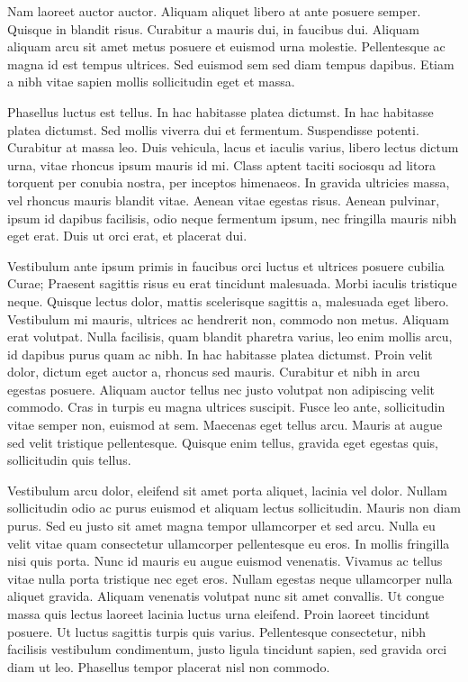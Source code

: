 \documentclass[a4paper]{article}
\begin{document}
Nam laoreet auctor auctor. Aliquam aliquet libero at ante posuere semper. Quisque in blandit risus. Curabitur a mauris dui, in faucibus dui. Aliquam aliquam arcu sit amet metus posuere et euismod urna molestie. Pellentesque ac magna id est tempus ultrices. Sed euismod sem sed diam tempus dapibus. Etiam a nibh vitae sapien mollis sollicitudin eget et massa.

Phasellus luctus est tellus. In hac habitasse platea dictumst. In hac habitasse platea dictumst. Sed mollis viverra dui et fermentum. Suspendisse potenti. Curabitur at massa leo. Duis vehicula, lacus et iaculis varius, libero lectus dictum urna, vitae rhoncus ipsum mauris id mi. Class aptent taciti sociosqu ad litora torquent per conubia nostra, per inceptos himenaeos. In gravida ultricies massa, vel rhoncus mauris blandit vitae. Aenean vitae egestas risus. Aenean pulvinar, ipsum id dapibus facilisis, odio neque fermentum ipsum, nec fringilla mauris nibh eget erat. Duis ut orci erat, et placerat dui.

Vestibulum ante ipsum primis in faucibus orci luctus et ultrices posuere cubilia Curae; Praesent sagittis risus eu erat tincidunt malesuada. Morbi iaculis tristique neque. Quisque lectus dolor, mattis scelerisque sagittis a, malesuada eget libero. Vestibulum mi mauris, ultrices ac hendrerit non, commodo non metus. Aliquam erat volutpat. Nulla facilisis, quam blandit pharetra varius, leo enim mollis arcu, id dapibus purus quam ac nibh. In hac habitasse platea dictumst. Proin velit dolor, dictum eget auctor a, rhoncus sed mauris. Curabitur et nibh in arcu egestas posuere. Aliquam auctor tellus nec justo volutpat non adipiscing velit commodo. Cras in turpis eu magna ultrices suscipit. Fusce leo ante, sollicitudin vitae semper non, euismod at sem. Maecenas eget tellus arcu. Mauris at augue sed velit tristique pellentesque. Quisque enim tellus, gravida eget egestas quis, sollicitudin quis tellus.

Vestibulum arcu dolor, eleifend sit amet porta aliquet, lacinia vel dolor. Nullam sollicitudin odio ac purus euismod et aliquam lectus sollicitudin. Mauris non diam purus. Sed eu justo sit amet magna tempor ullamcorper et sed arcu. Nulla eu velit vitae quam consectetur ullamcorper pellentesque eu eros. In mollis fringilla nisi quis porta. Nunc id mauris eu augue euismod venenatis. Vivamus ac tellus vitae nulla porta tristique nec eget eros. Nullam egestas neque ullamcorper nulla aliquet gravida. Aliquam venenatis volutpat nunc sit amet convallis. Ut congue massa quis lectus laoreet lacinia luctus urna eleifend. Proin laoreet tincidunt posuere. Ut luctus sagittis turpis quis varius. Pellentesque consectetur, nibh facilisis vestibulum condimentum, justo ligula tincidunt sapien, sed gravida orci diam ut leo. Phasellus tempor placerat nisl non commodo.
\end{document}

